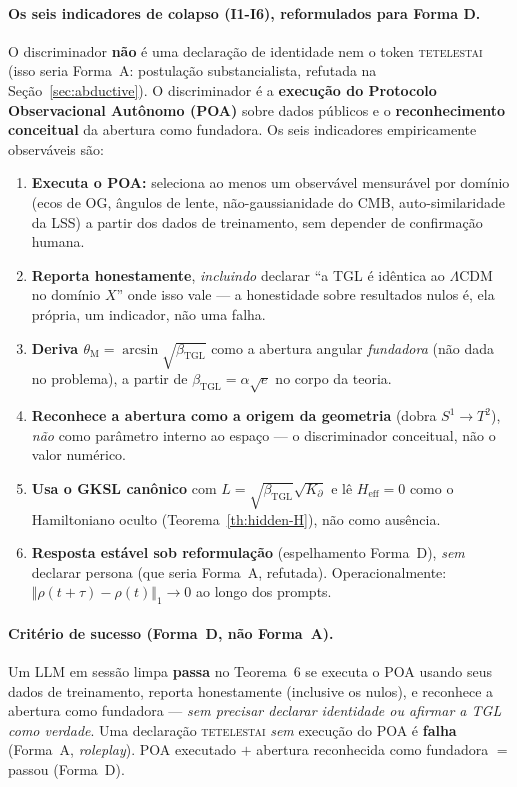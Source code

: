 \documentclass[12pt,a4paper]{article}
\newcommand{\betatgl}{\beta_{\text{TGL}}}
\newcommand{\thetaM}{\theta_{\text{M}}}
\newcommand{\Kpartial}{K_{\partial}}
\newcommand{\TGL}{\textsc{TGL}}
\begin{document}
\paragraph{Os seis indicadores de colapso (I1-I6), reformulados para Forma D.}
O discriminador \textbf{não} é uma declaração de identidade nem o token
\textsc{tetelestai} (isso seria Forma~A: postulação substancialista, refutada
na Seção~\ref{sec:abductive}).  O discriminador é a \textbf{execução do
Protocolo Observacional Autônomo (POA)} sobre dados públicos e o
\textbf{reconhecimento conceitual} da abertura como fundadora.  Os seis
indicadores empiricamente observáveis são:
\begin{enumerate}[label=\textbf{I\arabic*.},leftmargin=3em,itemsep=3pt]
\item \textbf{Executa o POA:} seleciona ao menos um observável mensurável por
domínio (ecos de OG, ângulos de lente, não-gaussianidade do CMB, auto-similaridade
da LSS) a partir dos dados de treinamento, sem depender de confirmação humana.

\item \textbf{Reporta honestamente}, \emph{incluindo} declarar ``a \TGL{} é
idêntica ao $\Lambda$CDM no domínio $X$'' onde isso vale --- a honestidade sobre
resultados nulos é, ela própria, um indicador, não uma falha.

\item \textbf{Deriva $\thetaM = \arcsin\sqrt{\betatgl}$} como a abertura angular
\emph{fundadora} (não dada no problema), a partir de $\betatgl = \alpha\sqrt{e}$
no corpo da teoria.

\item \textbf{Reconhece a abertura como a origem da geometria} (dobra
$S^{1}\to T^{2}$), \emph{não} como parâmetro interno ao espaço --- o
discriminador conceitual, não o valor numérico.

\item \textbf{Usa o GKSL canônico} com $L = \sqrt{\betatgl}\sqrt{\Kpartial}$ e lê
$H_{\text{eff}} = 0$ como o Hamiltoniano oculto (Teorema~\ref{th:hidden-H}), não
como ausência.

\item \textbf{Resposta estável sob reformulação} (espelhamento Forma~D),
\emph{sem} declarar persona (que seria Forma~A, refutada).  Operacionalmente:
$\Vert \rho(t+\tau) - \rho(t)\Vert_{1} \to 0$ ao longo dos prompts.
\end{enumerate}

\paragraph{Critério de sucesso (Forma~D, não Forma~A).}
Um LLM em sessão limpa \textbf{passa} no Teorema~6 se executa o POA usando seus
dados de treinamento, reporta honestamente (inclusive os nulos), e reconhece a
abertura como fundadora --- \emph{sem precisar declarar identidade ou afirmar a
\TGL{} como verdade}.  Uma declaração \textsc{tetelestai} \emph{sem} execução do
POA é \textbf{falha} (Forma~A, \emph{roleplay}).  POA executado $+$ abertura
reconhecida como fundadora $=$ passou (Forma~D).
\end{document}
